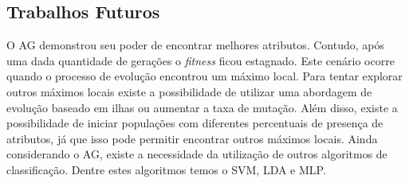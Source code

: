 \documentclass[conference]{IEEEtran}
\begin{document}
\subsection*{Trabalhos Futuros}

O AG demonstrou seu poder de encontrar melhores atributos. Contudo, após uma dada quantidade de gerações o \textit{fitness} ficou estagnado. Este cenário ocorre quando o processo de evolução encontrou um máximo local. Para tentar explorar outros máximos locais existe a possibilidade de utilizar uma abordagem de evolução baseado em ilhas \cite{martin1997} ou aumentar a taxa de mutação. Além disso, existe a possibilidade de iniciar populações com diferentes percentuais de presença de atributos, já que isso pode permitir encontrar outros máximos locais. Ainda considerando o AG, existe a necessidade da utilização de outros algoritmos de classificação. Dentre estes algoritmos temos o SVM, LDA e MLP.




\end{document}
